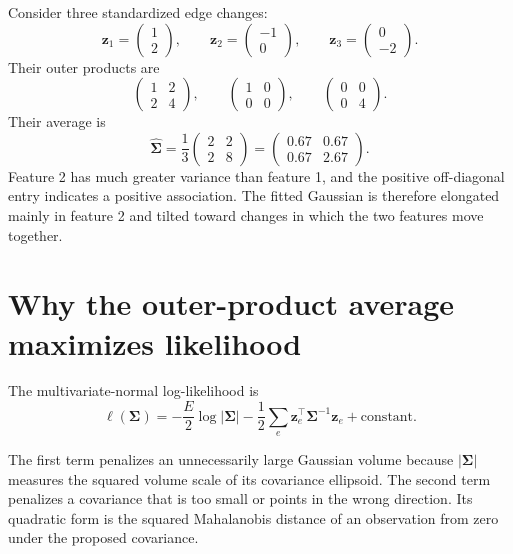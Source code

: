 \documentclass[10pt]{article}
\begin{document}
Consider three standardized edge changes:
\[
  \mathbf z_1=\begin{pmatrix}1\\2\end{pmatrix},\qquad
  \mathbf z_2=\begin{pmatrix}-1\\0\end{pmatrix},\qquad
  \mathbf z_3=\begin{pmatrix}0\\-2\end{pmatrix}.
\]
Their outer products are
\[
\begin{pmatrix}1&2\\2&4\end{pmatrix},\qquad
\begin{pmatrix}1&0\\0&0\end{pmatrix},\qquad
\begin{pmatrix}0&0\\0&4\end{pmatrix}.
\]
Their average is
\[
  \widehat{\boldsymbol\Sigma}
  =\frac{1}{3}\begin{pmatrix}2&2\\2&8\end{pmatrix}
  =\begin{pmatrix}0.67&0.67\\0.67&2.67\end{pmatrix}.
\]
Feature 2 has much greater variance than feature 1, and the positive
off-diagonal entry indicates a positive association.  The fitted Gaussian is
therefore elongated mainly in feature 2 and tilted toward changes in which the
two features move together.

\section{Why the outer-product average maximizes likelihood}

The multivariate-normal log-likelihood is
\begin{equation}
  \ell(\boldsymbol\Sigma)
  =-\frac{E}{2}\log|\boldsymbol\Sigma|
   -\frac{1}{2}\sum_e
      \mathbf z_e^\top\boldsymbol\Sigma^{-1}\mathbf z_e
   +\text{constant}.
  \label{eq:loglik}
\end{equation}

The first term penalizes an unnecessarily large Gaussian volume because
$|\boldsymbol\Sigma|$ measures the squared volume scale of its covariance
ellipsoid.  The second term penalizes a covariance that is too small or points
in the wrong direction.  Its quadratic form is the squared Mahalanobis
distance of an observation from zero under the proposed covariance.
\end{document}
